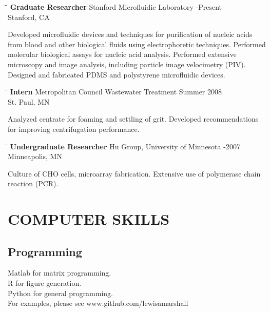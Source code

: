 \documentclass{res}
\begin{document}
\begin{resume}
   \begin{tabbing}
   \hspace{2.1in}\= \hspace{2.9in}\= \kill %
    {\bf Graduate Researcher} \>Stanford Microfluidic Laboratory    -Present\\
                             \>Stanford, CA
   \end{tabbing}\vspace{-20pt}      %
    Developed microfluidic devices and techniques for purification of nucleic acids from blood and other biological fluids using electrophoretic techniques. Performed molecular biological assays for nucleic acid analysis. Performed extensive microscopy and image analysis, including particle image velocimetry (PIV). Designed and fabricated PDMS and polystyrene microfluidic devices.
   \begin{tabbing}

   \hspace{2.1in}\= \hspace{2.9in}\= \kill %
    {\bf Intern} \>Metropolitan Council Wastewater Treatment \>  Summer 2008\\
                          \>St. Paul, MN
   \end{tabbing}\vspace{-20pt}
    Analyzed centrate for foaming and settling of grit. Developed recommendations for improving centrifugation performance.
   \begin{tabbing}%
   \hspace{2.1in}\= \hspace{2.9in}\= \kill %
   {\bf Undergraduate Researcher}  \>Hu Group, University of Minnesota -2007\\
                          \>Minneapolis, MN
   \end{tabbing}\vspace{-20pt}
    Culture of CHO cells, microarray fabrication. Extensive use of polymerase chain reaction (PCR).


 \section{COMPUTER SKILLS}
 	\subsection{Programming}
 	Matlab for matrix programming.\\
 	R for figure generation.\\
 	Python for general programming.\\
 	For examples, please see www.github.com/lewisamarshall

\end{resume}
\end{document}
